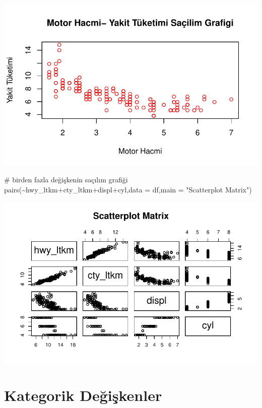 \documentclass[
  letterpaper,
  DIV=11,
  numbers=noendperiod]{scrreprt}
\newenvironment{Shaded}{\begin{snugshade}}{\end{snugshade}}
\newcommand{\AttributeTok}[1]{\textcolor[rgb]{0.40,0.45,0.13}{#1}}
\newcommand{\CommentTok}[1]{\textcolor[rgb]{0.37,0.37,0.37}{#1}}
\newcommand{\FunctionTok}[1]{\textcolor[rgb]{0.28,0.35,0.67}{#1}}
\newcommand{\NormalTok}[1]{\textcolor[rgb]{0.00,0.23,0.31}{#1}}
\newcommand{\SpecialCharTok}[1]{\textcolor[rgb]{0.37,0.37,0.37}{#1}}
\newcommand{\StringTok}[1]{\textcolor[rgb]{0.13,0.47,0.30}{#1}}
\begin{document}
\includegraphics{data_analysis_files/figure-pdf/unnamed-chunk-2-8.pdf}

\begin{Shaded}
\begin{Highlighting}[]
\CommentTok{\# birden fazla değişkenin saçılım grafiği}
\FunctionTok{pairs}\NormalTok{(}\SpecialCharTok{\textasciitilde{}}\NormalTok{hwy\_ltkm}\SpecialCharTok{+}\NormalTok{cty\_ltkm}\SpecialCharTok{+}\NormalTok{displ}\SpecialCharTok{+}\NormalTok{cyl,}\AttributeTok{data =}\NormalTok{ df,}\AttributeTok{main =} \StringTok{"Scatterplot Matrix"}\NormalTok{)}
\end{Highlighting}
\end{Shaded}

\includegraphics{data_analysis_files/figure-pdf/unnamed-chunk-2-9.pdf}

\section*{Kategorik Değişkenler}\label{kategorik-deux11fiux15fkenler}
\end{document}

